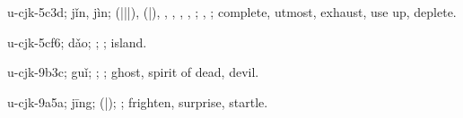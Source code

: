\begin{multicols}{2}
{\cjkgGlue{}u-cjk-5c3d; jǐn, jìn; \cjkgGlue{}\cjkgGlue{}(\cjkgGlue{}|\cjkgGlue{}|\cjkgGlue{}|\cjkgGlue{}), \cjkgGlue{}\cjkgGlue{}(\cjkgGlue{}|\cjkgGlue{}), \cjkgGlue{}\cjkgGlue{}\cjkgGlue{}, \cjkgGlue{}, \cjkgGlue{}\cjkgGlue{}\cjkgGlue{}, \cjkgGlue{}, \cjkgGlue{}; \cjkgGlue{}, \cjkgGlue{}; complete, utmost, exhaust, use up, deplete.

\cjkgGlue{}u-cjk-5cf6; dǎo; \cjkgGlue{}; \cjkgGlue{}; island.

\cjkgGlue{}u-cjk-9b3c; guǐ; \cjkgGlue{}; \cjkgGlue{}; ghost, spirit of dead, devil.

\cjkgGlue{}u-cjk-9a5a; jīng; \cjkgGlue{}\cjkgGlue{}(\cjkgGlue{}|\cjkgGlue{}); \cjkgGlue{}; frighten, surprise, startle.

}
\end{multicols}
